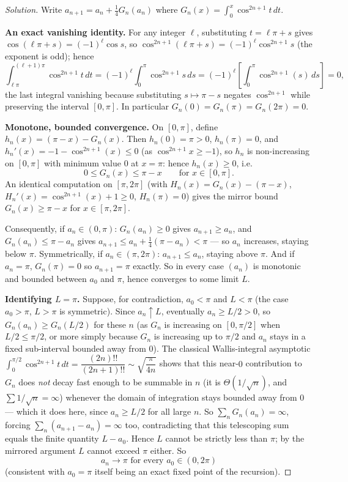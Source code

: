 \documentclass[11pt]{article}
\theoremstyle{definition}
\begin{document}
\begin{proof}[Solution]
Write $a_{n+1}=a_n+\tfrac14 G_n(a_n)$ where $G_n(x)=\int_0^x\cos^{2n+1}t\,dt$.

\textbf{An exact vanishing identity.} For any integer $\ell$, substituting $t=\ell\pi+s$ gives $\cos(\ell\pi+s)=(-1)^\ell\cos s$, so $\cos^{2n+1}(\ell\pi+s)=(-1)^\ell\cos^{2n+1}s$ (the exponent is odd); hence
\[
\int_{\ell\pi}^{(\ell+1)\pi}\cos^{2n+1}t\,dt=(-1)^\ell\int_0^\pi\cos^{2n+1}s\,ds=(-1)^\ell\left[\int_0^{\pi}\cos^{2n+1}(s)\,ds\right]=0,
\]
the last integral vanishing because substituting $s\mapsto\pi-s$ negates $\cos^{2n+1}$ while preserving the interval $[0,\pi]$. In particular $G_n(0)=G_n(\pi)=G_n(2\pi)=0$.

\textbf{Monotone, bounded convergence.} On $[0,\pi]$, define $h_n(x)=(\pi-x)-G_n(x)$. Then $h_n(0)=\pi>0$, $h_n(\pi)=0$, and $h_n'(x)=-1-\cos^{2n+1}(x)\le0$ (as $\cos^{2n+1}x\ge-1$), so $h_n$ is non-increasing on $[0,\pi]$ with minimum value $0$ at $x=\pi$: hence $h_n(x)\ge0$, i.e.
\[
0\le G_n(x)\le\pi-x\qquad\text{for }x\in[0,\pi].
\]
An identical computation on $[\pi,2\pi]$ (with $H_n(x)=G_n(x)-(\pi-x)$, $H_n'(x)=\cos^{2n+1}(x)+1\ge0$, $H_n(\pi)=0$) gives the mirror bound $G_n(x)\ge\pi-x$ for $x\in[\pi,2\pi]$.

Consequently, if $a_n\in(0,\pi)$: $G_n(a_n)\ge0$ gives $a_{n+1}\ge a_n$, and $G_n(a_n)\le\pi-a_n$ gives $a_{n+1}\le a_n+\tfrac14(\pi-a_n)<\pi$ — so $a_n$ increases, staying below $\pi$. Symmetrically, if $a_n\in(\pi,2\pi)$: $a_{n+1}\le a_n$, staying above $\pi$. And if $a_n=\pi$, $G_n(\pi)=0$ so $a_{n+1}=\pi$ exactly. So in every case $(a_n)$ is monotonic and bounded between $a_0$ and $\pi$, hence converges to some limit $L$.

\textbf{Identifying $L=\pi$.} Suppose, for contradiction, $a_0<\pi$ and $L<\pi$ (the case $a_0>\pi$, $L>\pi$ is symmetric). Since $a_n\uparrow L$, eventually $a_n\ge L/2>0$, so $G_n(a_n)\ge G_n(L/2)$ for these $n$ (as $G_n$ is increasing on $[0,\pi/2]$ when $L/2\le\pi/2$, or more simply because $G_n$ is increasing up to $\pi/2$ and $a_n$ stays in a fixed sub-interval bounded away from $0$). The classical Wallis-integral asymptotic $\int_0^{\pi/2}\cos^{2n+1}t\,dt=\dfrac{(2n)!!}{(2n+1)!!}\sim\sqrt{\dfrac{\pi}{4n}}$ shows that this near-$0$ contribution to $G_n$ does \emph{not} decay fast enough to be summable in $n$ (it is $\Theta(1/\sqrt n)$, and $\sum1/\sqrt n=\infty$) whenever the domain of integration stays bounded away from $0$ — which it does here, since $a_n\ge L/2$ for all large $n$. So $\sum_n G_n(a_n)=\infty$, forcing $\sum_n(a_{n+1}-a_n)=\infty$ too, contradicting that this telescoping sum equals the finite quantity $L-a_0$. Hence $L$ cannot be strictly less than $\pi$; by the mirrored argument $L$ cannot exceed $\pi$ either. So
\[
\boxed{a_n\to\pi\text{ for every }a_0\in(0,2\pi)}
\]
(consistent with $a_0=\pi$ itself being an exact fixed point of the recursion).
\end{proof}
\end{document}
